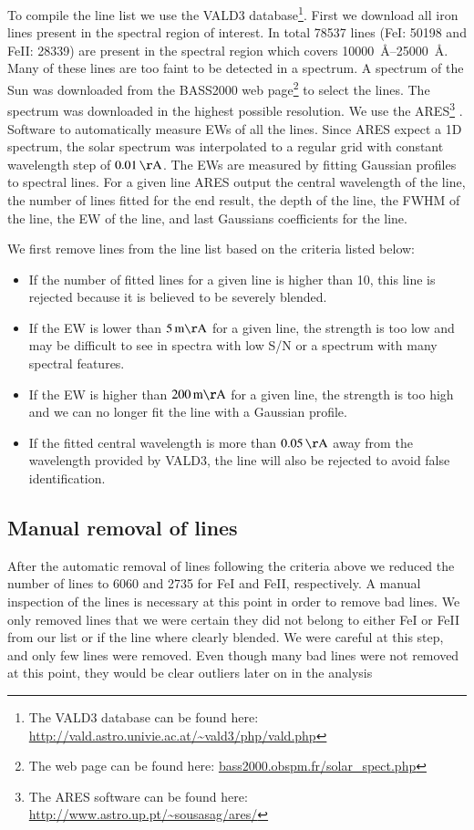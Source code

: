 \documentclass{aa}
\begin{document}
To compile the line list we use the VALD3
database\footnote{The VALD3 database can be found here:
\url{http://vald.astro.univie.ac.at/~vald3/php/vald.php}}.
First we download all iron lines present in the spectral
region of interest. In total 78537 lines (FeI: 50198 and
FeII: 28339) are present in the spectral region which covers
\SIrange{10000}{25000}{\angstrom}. Many of these lines are too faint
to be detected in a spectrum. A spectrum of the Sun was downloaded
from the BASS2000 web page\footnote{The web page can be found here:
\url{bass2000.obspm.fr/solar_spect.php}} to select the lines.
The spectrum was downloaded in the highest possible resolution.
We use the ARES\footnote{The ARES software can be found here:
\url{http://www.astro.up.pt/~sousasag/ares/}}\citep{Sousa2007,Sousa2015}
. Software to automatically measure EWs of all the lines. Since ARES
expect a 1D spectrum, the solar spectrum was interpolated to a regular
grid with constant wavelength step of $\SI{0.01}{\AA}$. The EWs are
measured by fitting Gaussian profiles to spectral lines. For a given
line ARES output the central wavelength of the line, the number of lines
fitted for the end result, the depth of the line, the FWHM of the line,
the EW of the line, and last Gaussians coefficients for the line.

We first remove lines from the line list based on the criteria listed
below:
\begin{itemize}
    \item If the number of fitted lines for a given line is higher than 10,
        this line is rejected because it is believed to be severely blended.
    \item If the EW is lower than $\SI{5}{m\AA}$ for a given line, the strength
        is too low and may be difficult to see in spectra with low S/N or a
        spectrum with many spectral features.
    \item If the EW is higher than $\SI{200}{m\AA}$ for a given line, the strength
        is too high and we can no longer fit the line with a Gaussian profile.
    \item If the fitted central wavelength is more than $\SI{0.05}{\AA}$ away
        from the wavelength provided by VALD3, the line will also be rejected to
        avoid false identification.
\end{itemize}




\subsection{Manual removal of lines}
\label{sub:manual_removal_of_lines}
After the automatic removal of lines following the criteria above
we reduced the number of lines to 6060 and 2735 for FeI and FeII,
respectively. A manual inspection of the lines is necessary at this
point in order to remove bad lines. We only removed lines that we were
certain they did not belong to either FeI or FeII from our list or if
the line where clearly blended. We were careful at this step, and only
few lines were removed. Even though many bad lines were not removed at
this point, they would be clear outliers later on in the analysis
\end{document}
